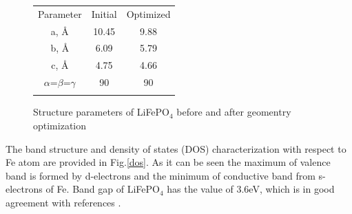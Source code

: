 \begin{figure}[h]
\begin{minipage}[h]{0.5\linewidth}
\begin{tabular}{ccc}
Parameter & Initial & Optimized \\
a, \AA & 10.45 & 9.88 \\
b, \AA & 6.09 & 5.79 \\
c, \AA & 4.75 & 4.66 \\
$\alpha$=$\beta$=$\gamma$ & 90 & 90 \\
& & \\
\end{tabular}
\end{minipage}
\hfill
\begin{minipage}[h]{0.35\linewidth}
\end{minipage}
\caption{Structure parameters of LiFePO$_4$ before and after geomentry optimization}
\label{tabular:str}
\end{figure}

The band structure and density of states (DOS) characterization with respect to Fe atom are provided in Fig.\ref{dos}. As it can be seen the maximum of valence band is formed by d-electrons and the minimum of conductive band from s-electrons of Fe. Band gap of LiFePO$_4$ has the value of 3.6eV, which is in good agreement with references \cite{bgap}.

